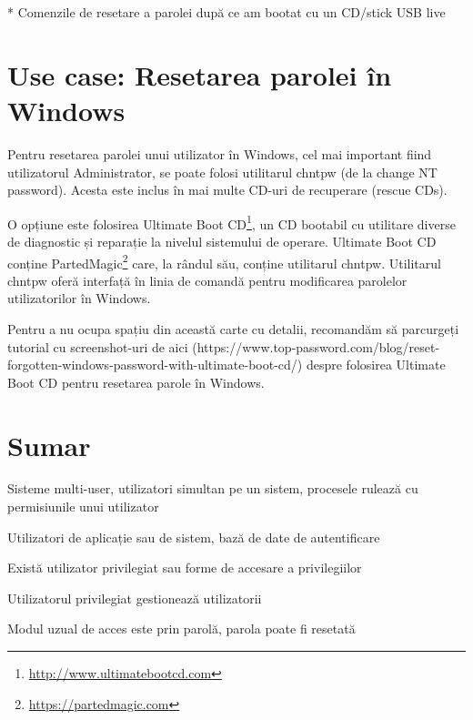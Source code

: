 * Comenzile de resetare a parolei după ce am bootat cu un CD/stick USB live

\section{Use case: Resetarea parolei în Windows}
\label{sec:users-pass-restore-window}

Pentru resetarea parolei unui utilizator în Windows, cel mai important fiind
utilizatorul Administrator, se poate folosi utilitarul chntpw (de la change NT
password). Acesta este inclus în mai multe CD-uri de recuperare (rescue CDs).

O opțiune este folosirea Ultimate Boot
CD\footnote{\url{http://www.ultimatebootcd.com}}, un CD bootabil cu utilitare
diverse de diagnostic și reparație la nivelul sistemului de operare. Ultimate
Boot CD conține PartedMagic\footnote{\url{https://partedmagic.com}} care, la
rândul său, conține utilitarul chntpw.  Utilitarul chntpw oferă interfață în
linia de comandă pentru modificarea parolelor utilizatorilor în Windows.

Pentru a nu ocupa spațiu din această carte cu detalii, recomandăm să parcurgeți
tutorial cu screenshot-uri de aici
(https://www.top-password.com/blog/reset-forgotten-windows-password-with-ultimate-boot-cd/)
despre folosirea Ultimate Boot CD pentru resetarea parole în Windows.

\section{Sumar}
\label{sec:users-sumar}

Sisteme multi-user, utilizatori simultan pe un sistem, procesele rulează cu
permisiunile unui utilizator

Utilizatori de aplicație sau de sistem, bază de date de autentificare

Există utilizator privilegiat sau forme de accesare a privilegiilor

Utilizatorul privilegiat gestionează utilizatorii

Modul uzual de acces este prin parolă, parola poate fi resetată

